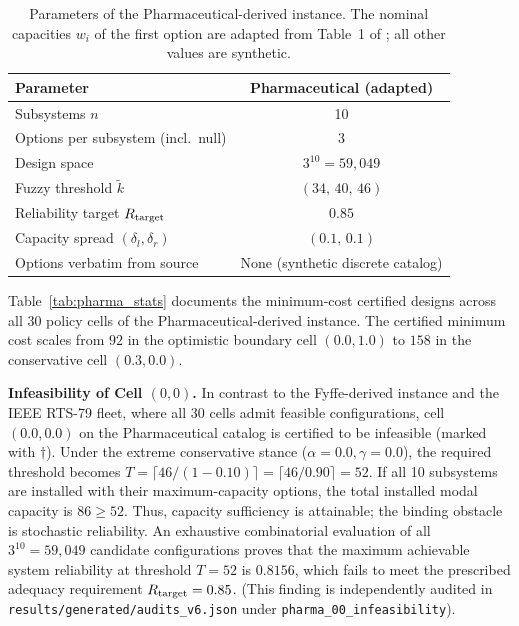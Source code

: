 \documentclass[11pt]{article}
\begin{document}
\begin{table}[htbp]
\centering
\caption{Parameters of the Pharmaceutical-derived instance. The nominal capacities $w_i$ of the first option are adapted from Table~1 of \citet{Garg2013}; all other values are synthetic.}
\label{tab:supp_pharma_parameters}
\small
\begin{tabular}{lc}
\hline
Parameter & Pharmaceutical (adapted) \\
\hline
Subsystems $n$ & 10 \\
Options per subsystem (incl.\ null) & 3 \\
Design space & $3^{10} = 59{,}049$ \\
Fuzzy threshold $\tilde{k}$ & $(34,\,40,\,46)$ \\
Reliability target $R_{\mathrm{target}}$ & $0.85$ \\
Capacity spread $(\delta_l,\delta_r)$ & $(0.1,\,0.1)$ \\
Options verbatim from source & None (synthetic discrete catalog) \\
\hline
\end{tabular}
\end{table}



Table~\ref{tab:pharma_stats} documents the minimum-cost certified designs across all $30$ policy cells of the Pharmaceutical-derived instance. The certified minimum cost scales from $92$ in the optimistic boundary cell $(0.0, 1.0)$ to $158$ in the conservative cell $(0.3, 0.0)$. 

\textbf{Infeasibility of Cell $(0,0)$.} In contrast to the Fyffe-derived instance and the IEEE RTS-79 fleet, where all $30$ cells admit feasible configurations, cell $(0.0, 0.0)$ on the Pharmaceutical catalog is certified to be infeasible (marked with $\dagger$). Under the extreme conservative stance ($\alpha=0.0, \gamma=0.0$), the required threshold becomes $T = \lceil 46 / (1-0.10) \rceil = \lceil 46 / 0.90 \rceil = 52$. If all 10 subsystems are installed with their maximum-capacity options, the total installed modal capacity is $86 \ge 52$. Thus, capacity sufficiency is attainable; the binding obstacle is stochastic reliability. An exhaustive combinatorial evaluation of all $3^{10} = 59{,}049$ candidate configurations proves that the maximum achievable system reliability at threshold $T=52$ is $0.8156$, which fails to meet the prescribed adequacy requirement $R_{\mathrm{target}} = 0.85$. (This finding is independently audited in \texttt{results/generated/audits\_v6.json} under \texttt{pharma\_00\_infeasibility}).
\end{document}
